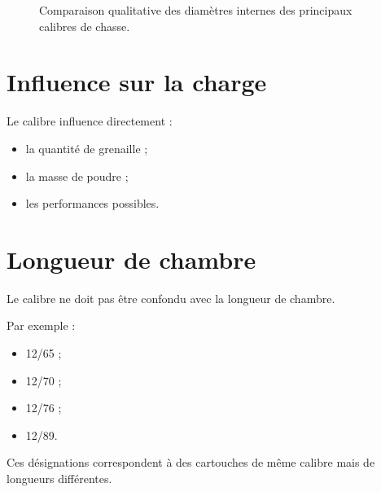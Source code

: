 \begin{figure}[htbp]
\centering


\caption{Comparaison qualitative des diamètres internes des principaux calibres de chasse.}
\label{fig:comparaison_calibres}

\end{figure}

\section{Influence sur la charge}

Le calibre influence directement :

\begin{itemize}
    \item la quantité de grenaille ;
    \item la masse de poudre ;
    \item les performances possibles.
\end{itemize}

\section{Longueur de chambre}

Le calibre ne doit pas être confondu avec la longueur de chambre.

Par exemple :

\begin{itemize}
    \item 12/65 ;
    \item 12/70 ;
    \item 12/76 ;
    \item 12/89.
\end{itemize}

Ces désignations correspondent à des cartouches de même calibre mais de
longueurs différentes.

